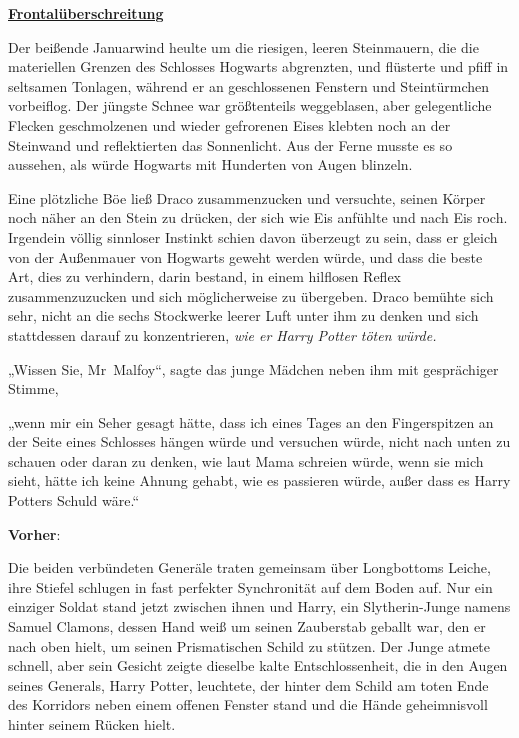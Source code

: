 

\hypertarget{frontaluxfcberschreitungen}{%

\textbf{\uline{Frontalüberschreitung}}

Der beißende Januarwind heulte um die riesigen, leeren Steinmauern, die die materiellen Grenzen des Schlosses Hogwarts abgrenzten, und flüsterte und pfiff in seltsamen Tonlagen, während er an geschlossenen Fenstern und Steintürmchen vorbeiflog. Der jüngste Schnee war größtenteils weggeblasen, aber gelegentliche Flecken geschmolzenen und wieder gefrorenen Eises klebten noch an der Steinwand und reflektierten das Sonnenlicht. Aus der Ferne musste es so aussehen, als würde Hogwarts mit Hunderten von Augen blinzeln.

Eine plötzliche Böe ließ Draco zusammenzucken und versuchte, seinen Körper noch näher an den Stein zu drücken, der sich wie Eis anfühlte und nach Eis roch. Irgendein völlig sinnloser Instinkt schien davon überzeugt zu sein, dass er gleich von der Außenmauer von Hogwarts geweht werden würde, und dass die beste Art, dies zu verhindern, darin bestand, in einem hilflosen Reflex zusammenzuzucken und sich möglicherweise zu übergeben. Draco bemühte sich sehr, nicht an die sechs Stockwerke leerer Luft unter ihm zu denken und sich stattdessen darauf zu konzentrieren, \emph{wie er Harry Potter töten würde.}

„Wissen Sie, Mr~Malfoy“, sagte das junge Mädchen neben ihm mit gesprächiger Stimme,

„wenn mir ein Seher gesagt hätte, dass ich eines Tages an den Fingerspitzen an der Seite eines Schlosses hängen würde und versuchen würde, nicht nach unten zu schauen oder daran zu denken, wie laut Mama schreien würde, wenn sie mich sieht, hätte ich keine Ahnung gehabt, wie es passieren würde, außer dass es Harry Potters Schuld wäre.“

\textbf{Vorher}:

Die beiden verbündeten Generäle traten gemeinsam über Longbottoms Leiche, ihre Stiefel schlugen in fast perfekter Synchronität auf dem Boden auf. Nur ein einziger Soldat stand jetzt zwischen ihnen und Harry, ein Slytherin-Junge namens Samuel Clamons, dessen Hand weiß um seinen Zauberstab geballt war, den er nach oben hielt, um seinen Prismatischen Schild zu stützen. Der Junge atmete schnell, aber sein Gesicht zeigte dieselbe kalte Entschlossenheit, die in den Augen seines Generals, Harry Potter, leuchtete, der hinter dem Schild am toten Ende des Korridors neben einem offenen Fenster stand und die Hände geheimnisvoll hinter seinem Rücken hielt.

}
